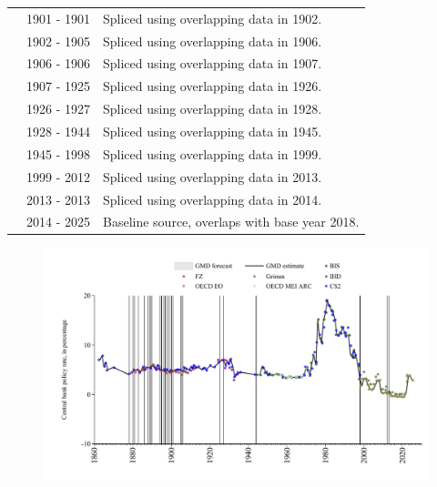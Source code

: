 \documentclass[12pt,a4paper,landscape]{article}
\begin{document}
\begin{adjustbox}{max totalsize={\paperwidth}{\paperheight},center}
\begin{minipage}[t][\textheight][t]{\textwidth}
\begin{table}[H]
\begin{tabular}{|l|l|l|}
\rowcolor{lightgray}\cite{FZ}& 1901 - 1901 &Spliced using overlapping data in 1902. \\
\rowcolor{white}\cite{CS2_ITA}& 1902 - 1905 &Spliced using overlapping data in 1906. \\
\rowcolor{lightgray}\cite{FZ}& 1906 - 1906 &Spliced using overlapping data in 1907. \\
\rowcolor{white}\cite{CS2_ITA}& 1907 - 1925 &Spliced using overlapping data in 1926. \\
\rowcolor{lightgray}\cite{IHD}& 1926 - 1927 &Spliced using overlapping data in 1928. \\
\rowcolor{white}\cite{CS2_ITA}& 1928 - 1944 &Spliced using overlapping data in 1945. \\
\rowcolor{lightgray}\cite{BIS}& 1945 - 1998 &Spliced using overlapping data in 1999. \\
\rowcolor{white}\cite{OECD_EO}& 1999 - 2012 &Spliced using overlapping data in 2013. \\
\rowcolor{lightgray}\cite{Grimm}& 2013 - 2013 &Spliced using overlapping data in 2014. \\
\rowcolor{white}\cite{OECD_EO}& 2014 - 2025 &Baseline source, overlaps with base year 2018. \\
\hline
\end{tabular}
\end{table}
\begin{figure}[H]
\centering
\includegraphics[width=\textwidth,height=0.6\textheight,keepaspectratio]{graphs/ITA_cbrate.pdf}
\end{figure}
\end{minipage}
\end{adjustbox}
\end{document}
